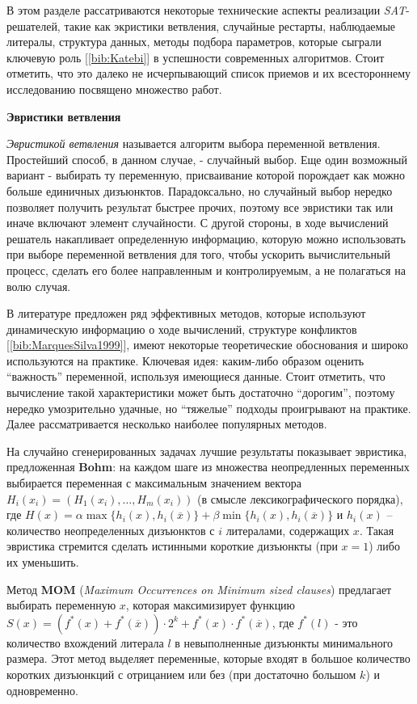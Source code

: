В этом разделе рассатриваются некоторые технические аспекты реализации \textit{SAT}-решателей, такие как экристики ветвления, случайные рестарты, наблюдаемые литералы, структура данных, методы подбора параметров, которые сыграли ключевую роль [\ref{bib:Katebi}] в успешности современных алгоритмов. Стоит отметить, что это далеко не исчерпывающий список приемов и их всестороннему исследованию посвящено множество работ.

\textbf{Эвристики ветвления}

\textit{Эвристикой ветвления} называется алгоритм выбора переменной ветвления. Простейший способ, в данном случае, - случайный выбор. Еще один возможный вариант - выбирать ту переменную, присваивание которой порождает как можно больше единичных дизъюнктов.
Парадоксально, но случайный выбор нередко позволяет получить результат быстрее прочих, поэтому все эвристики так или иначе включают элемент случайности. 
С другой стороны, в ходе вычислений решатель накапливает определенную информацию, которую можно использовать при выборе переменной ветвления для того, чтобы ускорить вычислительный процесс, сделать его более направленным и контролируемым, а не полагаться на волю случая. 

В литературе предложен ряд эффективных методов, которые используют динамическую информацию о ходе вычислений, 
структуре конфликтов [\ref{bib:MarquesSilva1999}], имеют некоторые теоретические обоснования и широко используются на практике. 
Ключевая идея: каким-либо образом оценить \enquote{важность} переменной, используя имеющиеся данные. Стоит отметить, что вычисление такой характеристики может быть достаточно \enquote{дорогим}, поэтому нередко умозрительно удачные, но \enquote{тяжелые} подходы проигрывают на практике. Далее рассматривается несколько наиболее популярных методов.

На случайно сгенерированных задачах лучшие результаты показывает эвристика, предложенная \textbf{Bohm}: на каждом шаге из множества неопредленных переменных выбирается переменная с максимальным значением вектора 
$H_i(x_i) = \left(H_1(x_i), \dots, H_m(x_i)\right)$ 
(в смысле лексикографического порядка), где
$H(x) = \alpha \max \{ h_i(x), h_i(\overline{x}) \} + \beta \min \{ h_i(x), h_i(\overline{x}) \}$
и $h_i(x)$ – количество неопределенных дизъюнктов с $i$ литералами, содержащих $x$.
Такая эвристика стремится сделать истинными короткие дизъюнкты (при $x=1$) либо их уменьшить.

Метод \textbf{MOM} (\textit{Maximum Occurrences on Minimum sized clauses}) предлагает выбирать переменную $x$, которая максимизирует функцию 
$S(x) = \left(f^{*}(x) + f^{*}(\overline{x})\right) \cdot 2^{k} + f^{*}(x) \cdot f^{*}(\overline{x})$, где $f^{*}(l)$ - это количество вхождений литерала $l$ в невыполненные дизъюнкты минимального размера. Этот метод выделяет переменные, которые входят в большое количество коротких дизъюнкций с отрицанием или без (при достаточно большом $k$) и одновременно.


